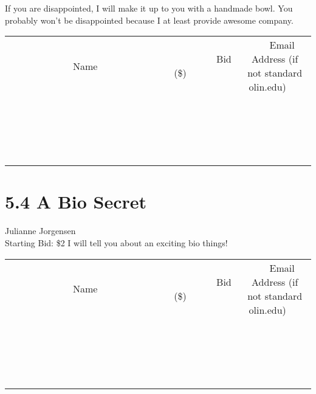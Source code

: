 \documentclass[11pt]{article}
\begin{document}
If you are disappointed, I will make it up to you with a handmade bowl. You probably won't be disappointed because I at least provide awesome company.
\\[3ex]
\begin{tabular}{c c c}
~~~~~~~~~~~~~Name~~~~~~~~~~~~~ & ~~~~~~~~~Bid (\$)~~~~~~~~~  & ~~~Email Address (if not standard olin.edu)~~~\\
 & & \\
\hline
 & & \\
\hline
 & & \\
\hline
 & & \\
\hline
 & & \\
\hline
 & & \\
\hline
 & & \\
\hline
 & & \\
\hline
 & & \\
\hline
 & & \\
\hline
 & & \\
\hline
 & & \\
\hline
 & & \\
\hline
 & & \\
\hline
 & & \\
\hline
 & & \\
\hline
 & & \\
\hline
 & & \\
\hline
 & & \\
\hline
\end{tabular}
\newpage
\section*{5.4 A Bio Secret}
Julianne Jorgensen
\\
Starting Bid: \$2
\newline
I will tell you about an exciting bio things!
\\[3ex]
\begin{tabular}{c c c}
~~~~~~~~~~~~~Name~~~~~~~~~~~~~ & ~~~~~~~~~Bid (\$)~~~~~~~~~  & ~~~Email Address (if not standard olin.edu)~~~\\
 & & \\
\hline
 & & \\
\hline
 & & \\
\hline
 & & \\
\hline
 & & \\
\hline
 & & \\
\hline
 & & \\
\hline
 & & \\
\hline
 & & \\
\hline
 & & \\
\hline
 & & \\
\hline
 & & \\
\hline
 & & \\
\hline
 & & \\
\hline
 & & \\
\hline
 & & \\
\hline
 & & \\
\hline
 & & \\
\hline
 & & \\
\hline
\end{tabular}
\newpage
\end{document}
